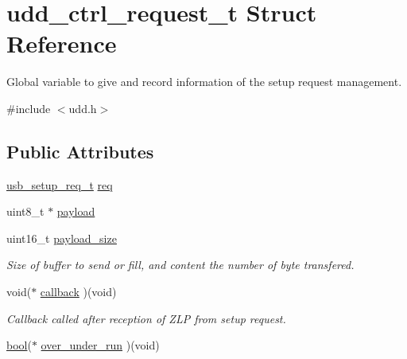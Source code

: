 \hypertarget{structudd__ctrl__request__t}{\section{udd\-\_\-ctrl\-\_\-request\-\_\-t Struct Reference}
\label{structudd__ctrl__request__t}
}


Global variable to give and record information of the setup request management.  




{\ttfamily \#include $<$udd.\-h$>$}

\subsection*{Public Attributes}
\begin{DoxyCompactItemize}
\item 
\hyperlink{structusb__setup__req__t}{usb\-\_\-setup\-\_\-req\-\_\-t} \hyperlink{structudd__ctrl__request__t_ab662e15ddbc5bc5f77592b24b937757b}{req}
\item 
uint8\-\_\-t $\ast$ \hyperlink{structudd__ctrl__request__t_a30ee45cc3e128d219f779f32635b6ca0}{payload}
\item 
\hypertarget{structudd__ctrl__request__t_a0ba5f434c1f252576dd707db0034917c}{uint16\-\_\-t \hyperlink{structudd__ctrl__request__t_a0ba5f434c1f252576dd707db0034917c}{payload\-\_\-size}}\label{structudd__ctrl__request__t_a0ba5f434c1f252576dd707db0034917c}

\begin{DoxyCompactList}\small\item\em Size of buffer to send or fill, and content the number of byte transfered. \end{DoxyCompactList}\item 
\hypertarget{structudd__ctrl__request__t_a942a0402e868519a5ce6864941dd939e}{void($\ast$ \hyperlink{structudd__ctrl__request__t_a942a0402e868519a5ce6864941dd939e}{callback} )(void)}\label{structudd__ctrl__request__t_a942a0402e868519a5ce6864941dd939e}

\begin{DoxyCompactList}\small\item\em Callback called after reception of Z\-L\-P from setup request. \end{DoxyCompactList}\item 
\hyperlink{group__group__xmega__utils_ga97a80ca1602ebf2303258971a2c938e2}{bool}($\ast$ \hyperlink{structudd__ctrl__request__t_afb9dab5e58e325dae17ea02345b097c4}{over\-\_\-under\-\_\-run} )(void)
\end{DoxyCompactItemize}


